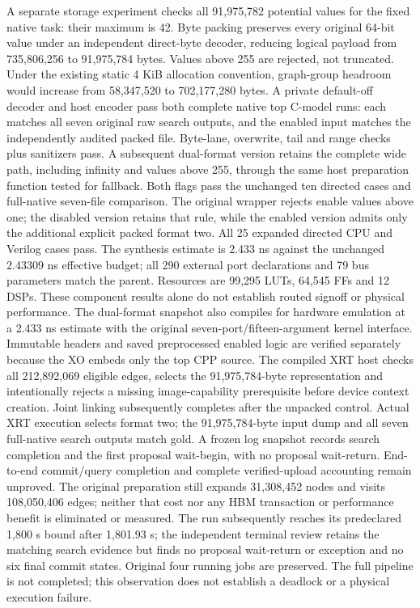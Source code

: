 \documentclass[10pt]{article}
\begin{document}
A separate storage experiment checks all 91,975,782 potential values
for the fixed native task: their maximum is 42. Byte packing preserves
every original 64-bit value under an independent direct-byte decoder,
reducing logical payload from 735,806,256 to 91,975,784 bytes. Values
above 255 are rejected, not truncated. Under the existing static 4 KiB
allocation convention, graph-group headroom would increase from
58,347,520 to 702,177,280 bytes. A private default-off decoder and host encoder pass both complete
native top C-model runs: each matches all seven original raw search
outputs, and the enabled input matches the independently audited packed
file. Byte-lane, overwrite, tail and range checks plus sanitizers pass.
A subsequent dual-format version retains the complete wide path,
including infinity and values above 255, through the same host
preparation function tested for fallback. Both flags pass the unchanged
ten directed cases and full-native seven-file comparison. The original
wrapper rejects enable values above one; the disabled version retains
that rule, while the enabled version admits only the additional explicit
packed format two. All 25 expanded directed CPU and Verilog cases pass.
The synthesis estimate is 2.433 ns against the unchanged 2.43309 ns
effective budget; all 290 external port declarations and 79 bus
parameters match the parent. Resources are 99,295 LUTs, 64,545 FFs and
12 DSPs. These component results alone do not establish routed
signoff or physical performance.
The dual-format snapshot also compiles for hardware emulation at a
2.433 ns estimate with the original seven-port/fifteen-argument kernel
interface. Immutable headers and saved preprocessed enabled logic are
verified separately because the XO embeds only the top CPP source.
The compiled XRT host checks all 212,892,069 eligible edges, selects
the 91,975,784-byte representation and intentionally rejects a missing
image-capability prerequisite before device context creation. Joint
linking subsequently completes after the unpacked control. Actual XRT
execution selects format two; the 91,975,784-byte input dump and all
seven full-native search outputs match gold. A frozen log snapshot
records search completion and the first proposal wait-begin, with no
proposal wait-return. End-to-end commit/query completion and complete
verified-upload accounting remain unproved. The original preparation
still expands 31,308,452 nodes and visits 108,050,406 edges; neither
that cost nor any HBM transaction or performance benefit is eliminated
or measured. The run subsequently reaches its predeclared 1,800 s
bound after 1,801.93 s; the independent terminal review retains the
matching search evidence but finds no proposal wait-return or exception
and no six final commit states. Original four running jobs are preserved.
The full pipeline is not completed; this observation does not establish
a deadlock or a physical execution failure.
\end{document}
